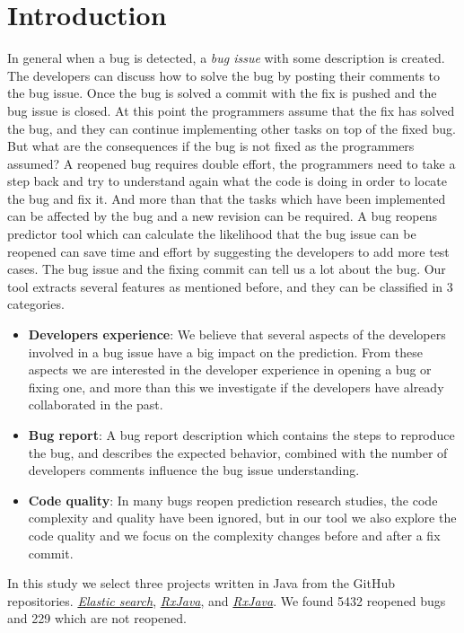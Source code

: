 \documentclass[sigconf,review]{acmart}
\begin{document}
\section{Introduction}
In general when a bug is detected, a \emph{bug issue} with some description is created. The developers can discuss how to solve the bug by posting their comments to the bug issue.
Once the bug is solved a commit with the fix is pushed and the bug issue is closed. At this point the programmers assume that the fix has solved the bug, and they can continue implementing other tasks on top of the fixed bug. But what are the consequences if the bug is not fixed as the programmers assumed? A reopened bug requires double effort, the programmers need to take a step back and try to understand again what the code is doing in order to locate the bug and fix it. And more than that the tasks which have been implemented can be affected by the bug and a new revision can be required. A bug reopens predictor tool which can calculate the likelihood that the bug issue can be reopened can save time and effort by suggesting the developers to add more test cases.
The bug issue and the fixing commit can tell us a lot about the bug. Our tool extracts several features as mentioned before, and they can be classified in 3 categories.
	\begin{itemize}
		\item \textbf{Developers experience}: We believe that several aspects of the developers involved in a bug issue have a big impact on the prediction. From these aspects we are interested in the developer experience in opening a bug or fixing one, and more than this we investigate if the developers have already collaborated in the past.
		\item \textbf{Bug report}: A bug report description which contains the steps to reproduce the bug, and describes the expected behavior, combined with the number of developers comments influence the bug issue understanding.
		\item \textbf{Code quality}: In many bugs reopen prediction research studies, the code complexity and quality have been ignored, but in our tool we also explore the code quality and we focus on the complexity changes before and after a fix commit.

	\end{itemize}



 In this study we select three projects written in Java from the GitHub repositories. \href{https://github.com/elastic/elasticsearch}{\emph{Elastic search}}, \href{https://github.com/ReactiveX/RxJava}{\emph{RxJava}}, and \href{https://github.com/ReactiveX/RxJava}{\emph{RxJava}}. We found 5432 reopened bugs and 229 which are not reopened.
\end{document}
